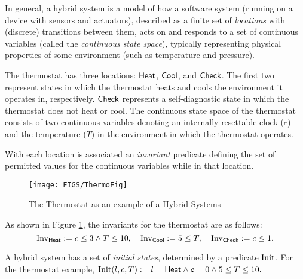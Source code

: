 \documentclass[runningheads]{llncs}
\newcommand{\Heat}{{\sf Heat}}
\newcommand{\Cool}{{\sf Cool}}
\newcommand{\Chec}{{\sf Check}}
\newcommand{\Inv}{{\rm Inv}}
\newcommand{\Init}{{\rm Init}}
\begin{document}
In general, a hybrid system is a model of how a software system (running on a device with sensors and actuators), described as a finite set of \emph{locations}
with (discrete) transitions between them, acts
on and responds to a set of continuous variables (called the
\emph{continuous state space}), typically representing physical
properties of some environment (such as temperature and pressure).




The thermostat has three locations: $\Heat$, $\Cool$, and $\Chec$. The first two represent states in which the thermostat heats and cools the environment it operates in, respectively. $\Chec$ represents a self-diagnostic state in which the thermostat does not heat or cool. The continuous state space of the thermostat consists of two continuous variables denoting an internally resettable clock ($c$) and the temperature ($T$) in the environment in which the thermostat operates.

With each location is associated an \emph{invariant} predicate defining the set of
permitted values for the continuous variables while in that location.

\begin{center}
\begin{figure}[htb!]
\begin{center}
    \texttt{[image: FIGS/ThermoFig]}
\end{center}
\caption{The Thermostat as an example of a Hybrid Systems \label{fig:thermostat}}
\end{figure}
\end{center}

As shown in Figure \ref{fig:thermostat}, the invariants for the thermostat are as follows: $$\Inv_{\Heat} := c\leq 3 \wedge T\leq 10,\quad \Inv_{\Cool} := 5 \leq T,\quad \Inv_{\Chec} := c\leq 1.$$

A hybrid system has a set of \emph{initial states}, determined by a predicate $\Init$. For the thermostat example,
$\Init(l,c,T) := l= \Heat \wedge c= 0 \wedge 5 \leq T \leq 10.$
\end{document}
